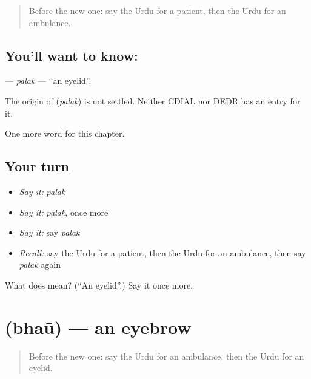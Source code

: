 \label{lesson:UR-C153-palak}



\begin{quote}
Before the new one: say the Urdu for a patient, then the Urdu for an ambulance.
\end{quote}

\subsection*{You'll want to know: }
\textbf{} — \emph{palak} — \textquotedblleft{}an eyelid\textquotedblright{}.

\begin{cousinweb}
The origin of \textbf{} (\emph{palak}) is not settled. Neither CDIAL nor DEDR has an entry for it.
\end{cousinweb}

\begin{grammarlens}[title={What you've built}]
One more word for this chapter.
\end{grammarlens}

\subsection*{Your turn}
\begin{itemize}
\raggedright
  \item \emph{Say it:} \emph{palak}
  \item \emph{Say it:} \emph{palak}, once more
  \item \emph{Say it:} say \emph{palak}
  \item \emph{Recall:} say the Urdu for a patient, then the Urdu for an ambulance, then say \emph{palak} again
\end{itemize}

\begin{tcolorbox}[breakable,colback=teal!4,colframe=teal!35!black,title={Before you move on}]
What does  mean? (\textquotedblleft{}An eyelid\textquotedblright{}.) Say it once more.
\end{tcolorbox}
\section[\texorpdfstring{\ur{بھوں} (bhaũ)}{بھوں (bhaũ)}]{ (bhaũ) — an eyebrow}

\label{lesson:UR-C153-bhau}



\begin{quote}
Before the new one: say the Urdu for an ambulance, then the Urdu for an eyelid.
\end{quote}

